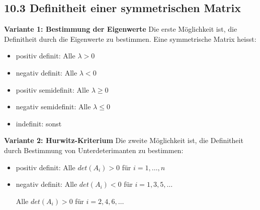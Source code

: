 \subsection{10.3 Definitheit einer symmetrischen Matrix}{
\vskip1pt

\textbf{Variante 1: Bestimmung der Eigenwerte} \vskip1pt
Die erste Möglichkeit ist, die Definitheit durch die Eigenwerte zu bestimmen. Eine symmetrische Matrix heisst:

\vspace{-4pt}
\begin{center}
\begin{minipage}[c]{0.65 \columnwidth}
\begin{itemize}[leftmargin=0.29cm, itemsep=0pt]
\item positiv definit: \hskip27pt Alle $\lambda > 0$
\item negativ definit: \hskip25pt Alle $\lambda < 0$
\item positiv semidefinit: \hskip13pt Alle $\lambda \geq 0$
\item negativ semidefinit: \hskip11pt Alle $\lambda \leq 0$
\item indefinit: \hskip45pt sonst
\end{itemize}
\end{minipage}
\end{center}
\vskip3pt

\null
\columnbreak
\textbf{Variante 2: Hurwitz-Kriterium} \vskip1pt
Die zweite Möglichkeit ist, die Definitheit durch Bestimmung von Unterdeterimanten zu bestimmen: \vskip8pt

\begin{itemize}[leftmargin=0.29cm, itemsep=0pt]
\item positiv definit: \hskip12pt Alle $det(A_i) > 0$ für $i = 1, \hdots, n$
\item negativ definit: \hskip10pt Alle $det(A_i) < 0$ für $i = 1, 3, 5, \hdots$ \par \hskip59pt Alle $det(A_i) > 0$ für $i = 2, 4, 6, \hdots$
\end{itemize}

}
\WhiteSpace